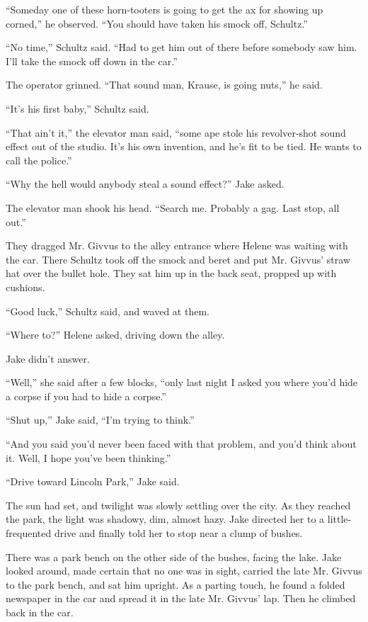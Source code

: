 \documentclass{novel}
\begin{document}
“Someday one of these horn-tooters is going to get the ax for showing up corned,” he observed. “You should have taken his smock off, Schultz.”

“No time,” Schultz said. “Had to get him out of there before somebody saw him. I’ll take the smock off down in the car.”

The operator grinned. “That sound man, Krause, is going nuts,” he said.

“It’s his first baby,” Schultz said.

“That ain’t it,” the elevator man said, “some ape stole his revolver-shot sound effect out of the studio. It’s his own invention, and he’s fit to be tied. He wants to call the police.”

“Why the hell would anybody steal a sound effect?” Jake asked.

The elevator man shook his head. “Search me. Probably a gag. Last stop, all out.”

They dragged Mr. Givvus to the alley entrance where Helene was waiting with the car. There Schultz took off the smock and beret and put Mr. Givvus’ straw hat over the bullet hole. They sat him up in the back seat, propped up with cushions.

“Good luck,” Schultz said, and waved at them.

“Where to?” Helene asked, driving down the alley.

Jake didn’t answer.

“Well,” she said after a few blocks, “only last night I asked you where you’d hide a corpse if you had to hide a corpse.”

“Shut up,” Jake said, “I’m trying to think.”

“And you said you’d never been faced with that problem, and you’d think about it. Well, I hope you’ve been thinking.”

“Drive toward Lincoln Park,” Jake said.

The sun had set, and twilight was slowly settling over the city. As they reached the park, the light was shadowy, dim, almost hazy. Jake directed her to a little-frequented drive and finally told her to stop near a clump of bushes.

There was a park bench on the other side of the bushes, facing the lake. Jake looked around, made certain that no one was in sight, carried the late Mr. Givvus to the park bench, and sat him upright. As a parting touch, he found a folded newspaper in the car and spread it in the late Mr. Givvus’ lap. Then he climbed back in the car.
\end{document}
